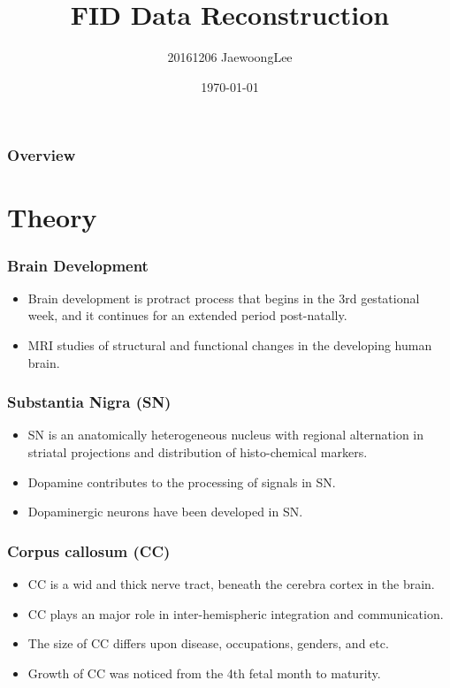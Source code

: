 \documentclass{beamer}
\title{FID Data Reconstruction}
\author[Jaewoong Lee]{20161206 JaewoongLee}
\institute[UNIST]
{
	Ulsan National Institute of Science and Technology
	\medskip
	\newline
	\textit{jwlee230@unist.ac.kr}
}
\date{\today}
\begin{document}
	\begin{frame}
		\titlepage
	\end{frame}

	\begin{frame}
		\frametitle{Overview}
		\tableofcontents
	\end{frame}

	\section{Theory}
	\begin{frame}
		\frametitle{Brain Development}
		\begin{itemize}
			\item Brain development is protract process that begins in the 3rd gestational week, and it continues for an extended period post-natally. \cite{ref:brain1}
			\item MRI studies of structural and functional changes in the developing human brain. \cite{ref:brain2}
		\end{itemize}
	\end{frame}

	\begin{frame}
		\frametitle{Substantia Nigra (SN)}
		\begin{itemize}
			\item SN is an anatomically heterogeneous nucleus with regional alternation in striatal projections and distribution of histo-chemical markers. \cite{ref:nigra1}
			\item Dopamine contributes to the processing of signals in SN. \cite{ref:nigra3}
			\item Dopaminergic neurons have been developed in SN. \cite{ref:nigra4}
		\end{itemize}
	\end{frame}

	\begin{frame}
		\frametitle{Corpus callosum (CC)}
		\begin{itemize}
			\item CC is a wid and thick nerve tract, beneath the cerebra cortex in the brain. 
			\item CC plays an major role in inter-hemispheric integration and communication. \cite{ref:cc1}
			\item The size of CC differs upon disease, occupations, genders, and etc. 
			\item Growth of CC was noticed from the 4th fetal month to maturity. \cite{ref:cc5, ref:cc6}
		\end{itemize}
	\end{frame}
\end{document}

